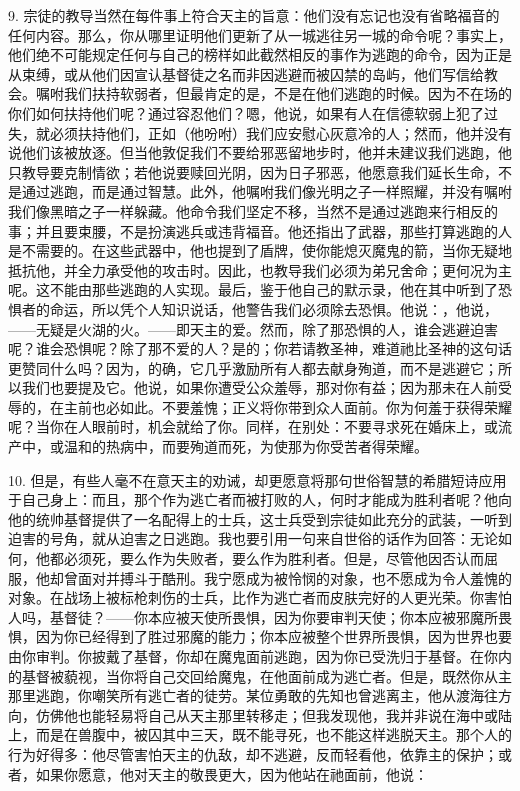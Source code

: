 9. 宗徒的教导当然在每件事上符合天主的旨意：他们没有忘记也没有省略福音的任何内容。那么，你从哪里证明他们更新了从一城逃往另一城的命令呢？事实上，他们绝不可能规定任何与自己的榜样如此截然相反的事作为逃跑的命令，因为正是从束缚，或从他们因宣认基督徒之名而非因逃避而被囚禁的岛屿，他们写信给教会。嘱咐我们扶持软弱者，但最肯定的是，不是在他们逃跑的时候。因为不在场的你们如何扶持他们呢？通过容忍他们？嗯，他说，如果有人在信德软弱上犯了过失，就必须扶持他们，正如（他吩咐）我们应安慰心灰意冷的人；然而，他并没有说他们该被放逐。但当他敦促我们不要给邪恶留地步时，他并未建议我们逃跑，他只教导要克制情欲；若他说要赎回光阴，因为日子邪恶，他愿意我们延长生命，不是通过逃跑，而是通过智慧。此外，他嘱咐我们像光明之子一样照耀，并没有嘱咐我们像黑暗之子一样躲藏。他命令我们坚定不移，当然不是通过逃跑来行相反的事；并且要束腰，不是扮演逃兵或违背福音。他还指出了武器，那些打算逃跑的人是不需要的。在这些武器中，他也提到了盾牌，使你能熄灭魔鬼的箭，当你无疑地抵抗他，并全力承受他的攻击时。因此，也教导我们必须为弟兄舍命；更何况为主呢。这不能由那些逃跑的人实现。最后，鉴于他自己的默示录，他在其中听到了恐惧者的命运，所以凭个人知识说话，他警告我们必须除去恐惧。他说：，他说，——无疑是火湖的火。——即天主的爱。然而，除了那恐惧的人，谁会逃避迫害呢？谁会恐惧呢？除了那不爱的人？是的；你若请教圣神，难道祂比圣神的这句话更赞同什么吗？因为，的确，它几乎激励所有人都去献身殉道，而不是逃避它；所以我们也要提及它。他说，如果你遭受公众羞辱，那对你有益；因为那未在人前受辱的，在主前也必如此。不要羞愧；正义将你带到众人面前。你为何羞于获得荣耀呢？当你在人眼前时，机会就给了你。同样，在别处：不要寻求死在婚床上，或流产中，或温和的热病中，而要殉道而死，为使那为你受苦者得荣耀。\par

10. 但是，有些人毫不在意天主的劝诫，却更愿意将那句世俗智慧的希腊短诗应用于自己身上：而且，那个作为逃亡者而被打败的人，何时才能成为胜利者呢？他向他的统帅基督提供了一名配得上的士兵，这士兵受到宗徒如此充分的武装，一听到迫害的号角，就从迫害之日逃跑。我也要引用一句来自世俗的话作为回答：无论如何，他都必须死，要么作为失败者，要么作为胜利者。但是，尽管他因否认而屈服，他却曾面对并搏斗于酷刑。我宁愿成为被怜悯的对象，也不愿成为令人羞愧的对象。在战场上被标枪刺伤的士兵，比作为逃亡者而皮肤完好的人更光荣。你害怕人吗，基督徒？——你本应被天使所畏惧，因为你要审判天使；你本应被邪魔所畏惧，因为你已经得到了胜过邪魔的能力；你本应被整个世界所畏惧，因为世界也要由你审判。你披戴了基督，你却在魔鬼面前逃跑，因为你已受洗归于基督。在你内的基督被藐视，当你将自己交回给魔鬼，在他面前成为逃亡者。但是，既然你从主那里逃跑，你嘲笑所有逃亡者的徒劳。某位勇敢的先知也曾逃离主，他从渡海往方向，仿佛他也能轻易将自己从天主那里转移走；但我发现他，我并非说在海中或陆上，而是在兽腹中，被囚其中三天，既不能寻死，也不能这样逃脱天主。那个人的行为好得多：他尽管害怕天主的仇敌，却不逃避，反而轻看他，依靠主的保护；或者，如果你愿意，他对天主的敬畏更大，因为他站在祂面前，他说：\par

